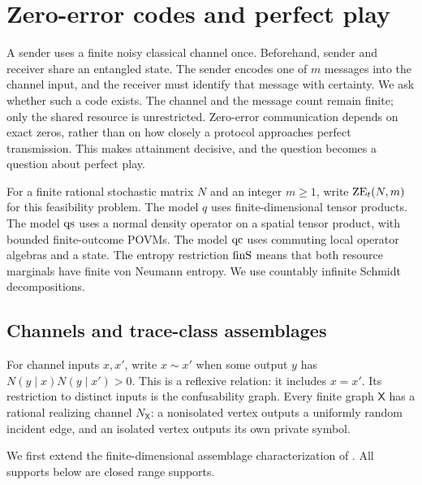 \section{Zero-error codes and perfect play}\label{sec:normal}
A sender uses a finite noisy classical channel once. Beforehand, sender and receiver share an entangled state. The sender encodes one of $m$ messages into the channel input, and the receiver must identify that message with certainty. We ask whether such a code exists. The channel and the message count remain finite; only the shared resource is unrestricted. Zero-error communication depends on exact zeros, rather than on how closely a protocol approaches perfect transmission. This makes attainment decisive, and the question becomes a question about perfect play.

For a finite rational stochastic matrix $N$ and an integer $m\geq1$, write $\mathrm{ZE}_t(N,m)$ for this feasibility problem. The model $q$ uses finite-dimensional tensor products. The model $\mathrm{qs}$ uses a normal density operator on a spatial tensor product, with bounded finite-outcome POVMs. The model $\mathrm{qc}$ uses commuting local operator algebras and a state. The entropy restriction $\mathrm{finS}$ means that both resource marginals have finite von Neumann entropy. We use countably infinite Schmidt decompositions.

\subsection{Channels and trace-class assemblages}
For channel inputs $x,x'$, write $x\sim x'$ when some output $y$ has $N(y\mid x)N(y\mid x')>0$. This is a reflexive relation: it includes $x=x'$. Its restriction to distinct inputs is the confusability graph. Every finite graph $\mathsf X$ has a rational realizing channel $N_{\mathsf X}$: a nonisolated vertex outputs a uniformly random incident edge, and an isolated vertex outputs its own private symbol.

We first extend the finite-dimensional assemblage characterization of \cite{CLMW}. All supports below are closed range supports.

